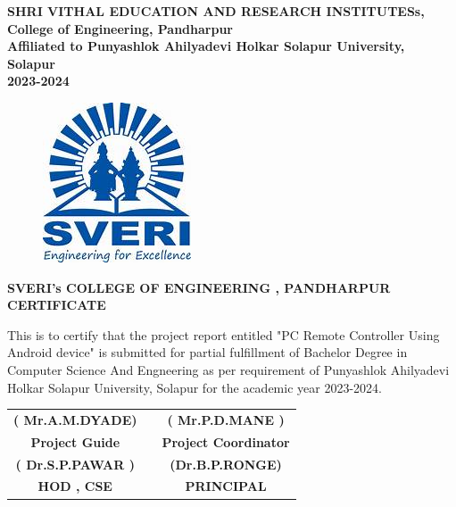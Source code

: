 \documentclass[12pt]{article}
\begin{document}
\begin{center}
\textbf{SHRI VITHAL EDUCATION AND RESEARCH INSTITUTESs,\\[2mm]
College of Engineering, Pandharpur\\[3mm]
Affiliated to Punyashlok Ahilyadevi Holkar Solapur University, Solapur\\[2mm]
2023-2024}
\end{center}  
 
\clearpage


\begin{figure}[h]
 \centering
 \includegraphics[scale=1]{sveri2logo}
\end{figure}

\begin{center}
 \large \textbf { SVERI's COLLEGE OF ENGINEERING , PANDHARPUR }\\[7mm]
 \textbf{CERTIFICATE}\\[7mm]
 \end{center} 
 This is to certify that the project report entitled "PC Remote Controller Using Android device" is submitted for partial fulfillment of Bachelor Degree in Computer Science And Engneering as per requirement of Punyashlok Ahilyadevi Holkar Solapur University, Solapur for the academic year 2023-2024.\\[30mm] 
 

 
 \begin{tabular}{ c c c } 
 \textbf{( Mr.A.M.DYADE)} & \hspace{2.0in} & \textbf{( Mr.P.D.MANE )} \\ [1mm] 
 \textbf {Project Guide} & \hspace{2.0in} & \textbf{Project Coordinator}\\[30mm]
 \textbf{( Dr.S.P.PAWAR )} & \hspace{2.0in}  & \textbf{(Dr.B.P.RONGE)}\\[1mm]
 \textbf{HOD , CSE } & \hspace{2.0in}  & \textbf{ PRINCIPAL }\\[30mm]
 \end{tabular}
 
\end{document}
